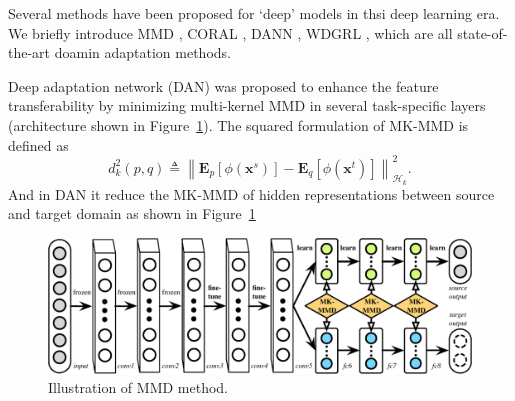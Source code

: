 \documentclass{article} %
\begin{document}
Several methods have been proposed for `deep' models in thsi deep learning era. We briefly introduce MMD \cite{long2015learning}, CORAL \cite{sun2016return}, DANN \cite{ajakan2014domain,ganin2016domain}, WDGRL \cite{shen2017adversarial}, which are all state-of-the-art doamin adaptation methods. 

Deep adaptation network (DAN) \cite{long2015learning} was proposed to enhance the feature transferability by minimizing multi-kernel MMD in several task-specific layers (architecture shown in Figure~\ref{fig:mmd}). The squared formulation of MK-MMD is defined as
\begin{equation}\label{eqn:MMD}
d_k^2\left( {p,q} \right) \triangleq \left\| {{{\mathbf{E}}_p}\left[ {\phi \left( {{{\mathbf{x}}^s}} \right)} \right] - {{\mathbf{E}}_q}\left[ {\phi \left( {{{\mathbf{x}}^t}} \right)} \right]} \right\|_{{\mathcal{H}_k}}^2.
\end{equation}
And in DAN it reduce the MK-MMD of hidden representations between source and target domain as shown in Figure~\ref{fig:mmd}
\begin{figure}[H]
\centering
\includegraphics[width=0.7\linewidth]{figs/DAN}
\caption{Illustration of MMD method.}
\label{fig:mmd}
\end{figure}
\end{document}
